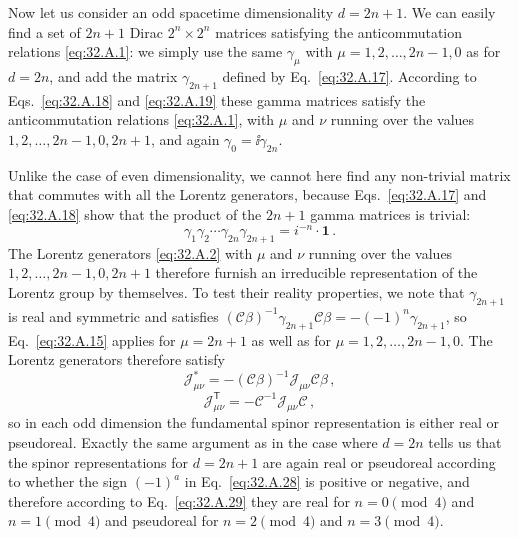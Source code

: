 Now let us consider an odd spacetime dimensionality \(d=2n+1\). We can
easily find a set of \(2n+1\) Dirac \(2^n\times 2^n\) matrices satisfying the
anticommutation relations \eqref{eq:32.A.1}: we simply use the same
\(\gamma_\mu\) with \(\mu=1,2,\ldots,2n-1,0\) as for \(d=2n\), and add
the matrix \(\gamma_{2n+1}\) defined by Eq.~\eqref{eq:32.A.17}. According
to Eqs.~\eqref{eq:32.A.18} and \eqref{eq:32.A.19} these gamma matrices
satisfy the anticommutation relations \eqref{eq:32.A.1}, with \(\mu\) and
\(\nu\) running over the values \(1,2,\ldots,2n-1,0,2n+1\), and again
\(\gamma_0=\ii\gamma_{2n}\).

Unlike the case of even dimensionality, we cannot here find any non-trivial
matrix that commutes with all the Lorentz generators, because
Eqs.~\eqref{eq:32.A.17} and \eqref{eq:32.A.18} show that the product of the
\(2n+1\) gamma matrices is trivial:
\begin{equation}
  \gamma_1\gamma_2\cdots\gamma_{2n}\gamma_{2n+1}
  =i^{-n}\mathbin{\cdot}\mathbf{1}\,.
  \tag{32.A.36}\label{eq:32.A.36}
\end{equation}
The Lorentz generators \eqref{eq:32.A.2} with \(\mu\) and \(\nu\) running
over the values \(1,2,\ldots,2n-1,0,2n+1\) therefore furnish an irreducible
representation of the Lorentz group by themselves. To test their reality
properties, we note that \(\gamma_{2n+1}\) is real and symmetric and
satisfies
\((\mathcal C\beta)^{-1}\gamma_{2n+1}\mathcal C\beta
=-(-1)^n\gamma_{2n+1}\), so Eq.~\eqref{eq:32.A.15} applies for
\(\mu=2n+1\) as well as for \(\mu=1,2,\ldots,2n-1,0\). The Lorentz
generators therefore satisfy
\begin{equation}
  \mathcal J_{\mu\nu}^*
  =-(\mathcal C\beta)^{-1}\mathcal J_{\mu\nu}\mathcal C\beta\,,
  \tag{32.A.37}\label{eq:32.A.37}
\end{equation}
\begin{equation}
  \mathcal J_{\mu\nu}^{\mathsf T}
  =-\mathcal C^{-1}\mathcal J_{\mu\nu}\mathcal C\,,
  \tag{32.A.38}\label{eq:32.A.38}
\end{equation}
so in each odd dimension the fundamental spinor representation is either
real or pseudoreal. Exactly the same argument as in the case where \(d=2n\)
tells us that the spinor representations for \(d=2n+1\) are again real or
pseudoreal according to whether the sign \((-1)^a\) in
Eq.~\eqref{eq:32.A.28} is positive or negative, and therefore according to
Eq.~\eqref{eq:32.A.29} they are real for \(n=0\pmod 4\) and
\(n=1\pmod 4\) and pseudoreal for \(n=2\pmod 4\) and \(n=3\pmod 4\).

